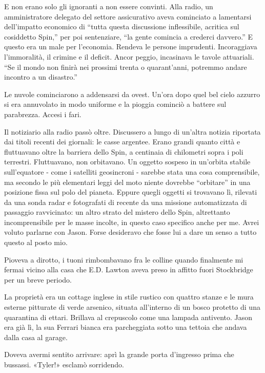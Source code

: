 E non erano solo gli ignoranti a non essere convinti. Alla radio, un
amministratore delegato del settore assicurativo aveva cominciato a
lamentarsi dell'impatto economico di ``tutta questa discussione
inflessibile, acritica sul cosiddetto Spin,'' per poi sentenziare, ``la
gente comincia a crederci davvero.'' E questo era un male per
l'economia. Rendeva le persone imprudenti. Incoraggiava l'immoralità, il
crimine e il deficit. Ancor peggio, incasinava le tavole attuariali.
``Se il mondo non finirà nei prossimi trenta o quarant'anni, potremmo
andare incontro a un disastro.''

Le nuvole cominciarono a addensarsi da ovest. Un'ora dopo quel bel cielo
azzurro si era annuvolato in modo uniforme e la pioggia cominciò a
battere sul parabrezza. Accesi i fari.

Il notiziario alla radio passò oltre. Discussero a lungo di un'altra
notizia riportata dai titoli recenti dei giornali: le casse argentee.
Erano grandi quanto città e fluttuavano oltre la barriera dello Spin, a
centinaia di chilometri sopra i poli terrestri. Fluttuavano, non
orbitavano. Un oggetto sospeso in un'orbita stabile sull'equatore - come
i satelliti geosincroni - sarebbe stata una cosa comprensibile, ma
secondo le più elementari leggi del moto niente dovrebbe ``orbitare'' in
una posizione fissa sul polo del pianeta. Eppure quegli oggetti si
trovavano lì, rilevati da una sonda radar e fotografati di recente da
una missione automatizzata di passaggio ravvicinato: un altro strato del
mistero dello Spin, altrettanto incomprensibile per le masse incolte, in
questo caso specifico anche per me. Avrei voluto parlarne con Jason.
Forse desideravo che fosse lui a dare un senso a tutto questo al posto
mio.

\separatorefiori

Pioveva a dirotto, i tuoni rimbombavano fra le colline quando finalmente
mi fermai vicino alla casa che E.D. Lawton aveva preso in affitto fuori
Stockbridge per un breve periodo.

La proprietà era un cottage inglese in stile rustico con quattro stanze
e le mura esterne pitturate di verde arsenico, situata all'interno di un
bosco protetto di una quarantina di ettari. Brillava al crepuscolo come
una lampada antivento. Jason era già lì, la sua Ferrari bianca era
parcheggiata sotto una tettoia che andava dalla casa al garage.

Doveva avermi sentito arrivare: aprì la grande porta d'ingresso prima
che bussassi. «Tyler!» esclamò sorridendo.

